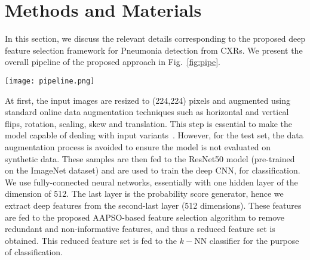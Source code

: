 \documentclass[final,3p,times]{elsarticle}
\begin{document}
\section{Methods and Materials}
\label{sec:proposed}
In this {section, we discuss} the relevant details corresponding to the proposed deep feature selection framework for Pneumonia detection from CXRs. {We present} the overall pipeline of the proposed approach in Fig.~\ref{fig:pipe}.
\begin{figure*}[ht!]
    \centering
    \texttt{[image: pipeline.png]}
    \caption{The overall pipeline of the proposed approach used for Pneumonia detection from CXRs. First, the images are resized and augmented using standard techniques. Then these are fed to the pre-trained ResNet50 model for deep feature extraction. After that the proposed AAPSO selects the most informative features. Finally, the classification is performed using the $k-$NN classifier.}
    \label{fig:pipe}
\end{figure*}
At first, the input images are resized to (224,224) pixels and augmented using standard online data augmentation techniques such as horizontal and vertical flips, rotation, scaling, skew and translation. This step is essential to make the model capable of dealing with input variants~\cite{pramanik2022fuzzy}. However, for the test {set, the data augmentation process} is avoided to ensure the model is not evaluated on synthetic data. These samples are then fed to the ResNet50 model (pre-trained on the ImageNet dataset) and are used to train the deep CNN, for classification. We use fully-connected neural networks, essentially with one hidden layer of the dimension of 512. The last layer is the probability score generator, hence we extract deep features from the {second-last} layer (512 dimensions). These features are fed to the proposed {AAPSO-based} feature selection algorithm to remove redundant and non-informative features, and thus a reduced feature set is obtained. This reduced feature set is fed to the $k-$NN classifier for the {purpose of classification}.
\end{document}
